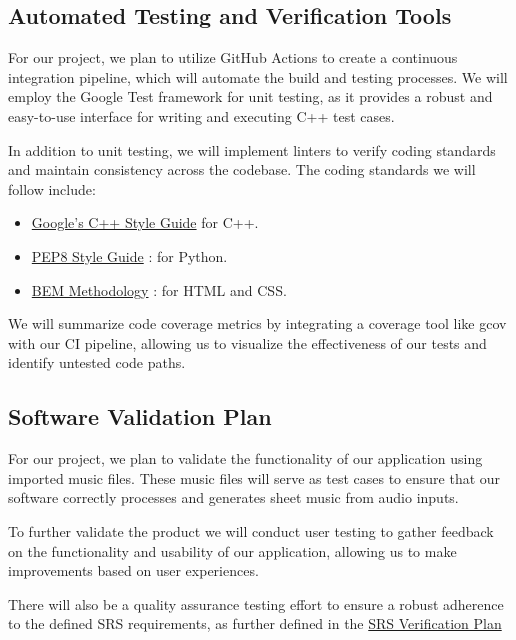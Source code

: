 \documentclass[12pt, titlepage]{article}
\begin{document}
\subsection{Automated Testing and Verification Tools}

For our project, we plan to utilize GitHub Actions to create a continuous integration pipeline, which will automate the build and testing processes. We will employ the Google Test framework for unit testing, as it provides a robust and easy-to-use interface for writing and executing C++ test cases.

In addition to unit testing, we will implement linters to verify coding standards and maintain consistency across the codebase. The coding standards we will follow include:

\begin{itemize}
    \item \href{https://google.github.io/styleguide/cppguide.html}{Google's C++ Style Guide} \citep*{GoogleCppStyleGuide} for C++.
    \item \href{https://peps.python.org/pep-0008/}{PEP8 Style Guide} \citep*{PEP8PythonStyleGuide}: for Python.
    \item \href{https://getbem.com/}{BEM Methodology} \citep*{BEMMethodology}: for HTML and CSS.
\end{itemize}

We will summarize code coverage metrics by integrating a coverage tool like gcov with our CI pipeline, allowing us to visualize the effectiveness of our tests and identify untested code paths.

\subsection{Software Validation Plan}

For our project, we plan to validate the functionality of our application using imported music files. These music files will serve as test cases to ensure that our software correctly processes and generates sheet music from audio inputs.

To further validate the product we will conduct user testing to gather feedback on the functionality and usability of our application, allowing us to make improvements based on user experiences.

There will also be a quality assurance testing effort to ensure a robust adherence to the defined SRS requirements, as further defined in the \hyperref[sec:srs_verification]{SRS Verification Plan}
\end{document}
